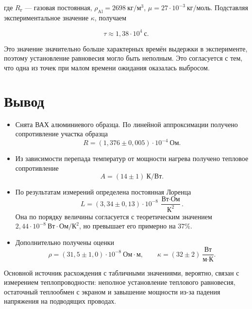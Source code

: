 \documentclass[a4paper,12pt]{article}
\begin{document}
где $R_{\text{г}}$ --- газовая постоянная, $\rho_{\text{Al}} = 2698~\text{кг}/\text{м}^3$, $\mu = 27\cdot 10^{-3}~\text{кг}/\text{моль}$. Подставляя экспериментальное значение $\kappa$, получаем

\begin{equation}
    \tau \approx 1{,}38 \cdot 10^4~\text{с}.
\end{equation}

Это значение значительно больше характерных времён выдержки в эксперименте, поэтому установление равновесия могло быть неполным. Это согласуется с тем, что одна из точек при малом времени ожидания оказалась выбросом.

\FloatBarrier
\section{Вывод}

\begin{itemize}
    \item Снята ВАХ алюминиевого образца. По линейной аппроксимации получено сопротивление участка образца
    \[
        R = (1{,}376 \pm 0{,}005)\cdot 10^{-4}~\text{Ом}.
    \]

    \item Из зависимости перепада температур от мощности нагрева получено тепловое сопротивление
    \[
        A = (14 \pm 1)~\text{К}/\text{Вт}.
    \]

    \item По результатам измерений определена постоянная Лоренца
    \[
        L = (3{,}34 \pm 0{,}13)\cdot 10^{-8}~
        \frac{\text{Вт}\cdot\text{Ом}}{\text{К}^2}.
    \]
    Она по порядку величины согласуется с теоретическим значением $2{,}44\cdot 10^{-8}~\text{Вт}\cdot\text{Ом}/\text{К}^2$, но превышает его примерно на $37\%$.

    \item Дополнительно получены оценки
    \[
        \rho = (31{,}5 \pm 1{,}0)\cdot 10^{-8}~\text{Ом}\cdot\text{м}, \qquad
        \kappa = (32 \pm 2)~\frac{\text{Вт}}{\text{м}\cdot\text{К}}.
    \]
\end{itemize}

Основной источник расхождения с табличными значениями, вероятно, связан с измерением теплопроводности: неполное установление теплового равновесия, остаточный теплообмен с экраном и завышение мощности из-за падения напряжения на подводящих проводах.
\end{document}
